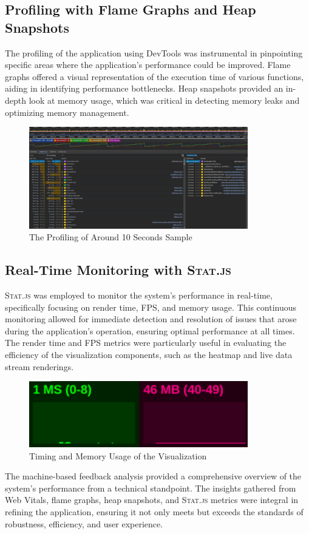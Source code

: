 \subsection{Profiling with Flame Graphs and Heap Snapshots}
The profiling of the application using DevTools was instrumental in pinpointing specific areas where the application's performance could be improved. Flame graphs offered a visual representation of the execution time of various functions, aiding in identifying performance bottlenecks. Heap snapshots provided an in-depth look at memory usage, which was critical in detecting memory leaks and optimizing memory management.

\begin{figure}[htbp]
  \centering
  \includegraphics[width=0.85\textwidth]{Pictures/profiling}
  \caption{\label{fig:profiling}The Profiling of Around 10 Seconds Sample}
\end{figure}
\subsection{Real-Time Monitoring with \textsc{Stat.js}}
\textsc{Stat.js} was employed to monitor the system's performance in real-time, specifically focusing on render time, FPS, and memory usage. This continuous monitoring allowed for immediate detection and resolution of issues that arose during the application's operation, ensuring optimal performance at all times. The render time and FPS metrics were particularly useful in evaluating the efficiency of the visualization components, such as the heatmap and live data stream renderings.

\begin{figure}[htbp]
  \centering
  \includegraphics[width=0.85\textwidth]{Pictures/stats}
  \caption{\label{fig:stats}Timing and Memory Usage of the Visualization}
\end{figure}

The machine-based feedback analysis provided a comprehensive overview of the system's performance from a technical standpoint. The insights gathered from Web Vitals, flame graphs, heap snapshots, and \textsc{Stat.js} metrics were integral in refining the application, ensuring it not only meets but exceeds the standards of robustness, efficiency, and user experience.
